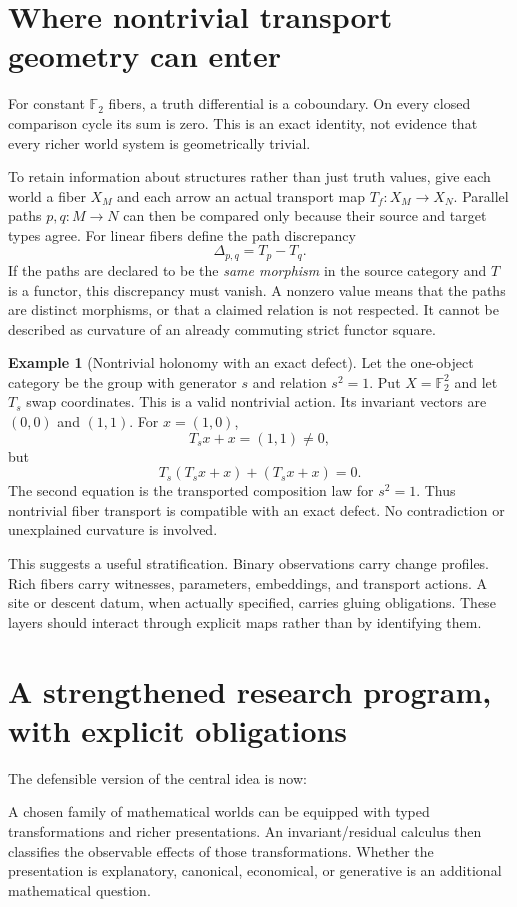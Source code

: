\documentclass[11pt,letterpaper]{article}
\theoremstyle{definition}
\newtheorem{example}[theorem]{Example}
\newcommand{\F}{\mathbb F_2}
\begin{document}
\section{Where nontrivial transport geometry can enter}\label{sec:geometry}
For constant $\F$ fibers, a truth differential is a coboundary. On every closed comparison cycle its sum is zero. This is an exact identity, not evidence that every richer world system is geometrically trivial.

To retain information about structures rather than just truth values, give each world a fiber $X_M$ and each arrow an actual transport map $T_f:X_M\to X_N$. Parallel paths $p,q:M\to N$ can then be compared only because their source and target types agree. For linear fibers define the path discrepancy
\[
\Delta_{p,q}=T_p-T_q.
\]
If the paths are declared to be the \emph{same morphism} in the source category and $T$ is a functor, this discrepancy must vanish. A nonzero value means that the paths are distinct morphisms, or that a claimed relation is not respected. It cannot be described as curvature of an already commuting strict functor square.

\begin{example}[Nontrivial holonomy with an exact defect]\label{ex:holonomy}
Let the one-object category be the group with generator $s$ and relation $s^2=1$. Put $X=\F^2$ and let $T_s$ swap coordinates. This is a valid nontrivial action. Its invariant vectors are $(0,0)$ and $(1,1)$.
For $x=(1,0)$,
\[
T_sx+x=(1,1)\ne0,
\]
but
\[
T_s(T_sx+x)+(T_sx+x)=0.
\]
The second equation is the transported composition law for $s^2=1$. Thus nontrivial fiber transport is compatible with an exact defect. No contradiction or unexplained curvature is involved.
\end{example}

This suggests a useful stratification. Binary observations carry change profiles. Rich fibers carry witnesses, parameters, embeddings, and transport actions. A site or descent datum, when actually specified, carries gluing obligations. These layers should interact through explicit maps rather than by identifying them.

\section{A strengthened research program, with explicit obligations}\label{sec:program}
The defensible version of the central idea is now:
\begin{scopebox}
A chosen family of mathematical worlds can be equipped with typed transformations and richer presentations. An invariant/residual calculus then classifies the observable effects of those transformations. Whether the presentation is explanatory, canonical, economical, or generative is an additional mathematical question.
\end{scopebox}
\end{document}
